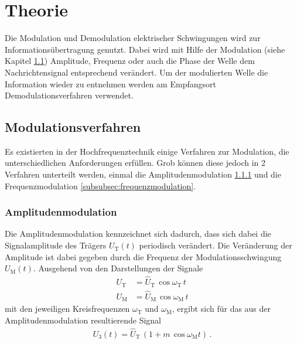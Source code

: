 \section{Theorie}
\label{sec:Theorie}
Die Modulation und Demodulation
elektrischer Schwingungen wird
zur Informationsübertragung genutzt.
Dabei wird mit Hilfe der Modulation
(siehe Kapitel \ref{subsec:modulationsverfahren})
Amplitude, Frequenz oder auch die Phase
der Welle dem Nachrichtensignal entsprechend
verändert.
Um der modulierten Welle die Information
wieder zu entnehmen werden am Empfangsort
Demodulationsverfahren verwendet.

\subsection{Modulationsverfahren}
\label{subsec:modulationsverfahren}
Es existierten in der Hochfrequenztechnik einige
Verfahren zur Modulation, die unterschiedlichen
Anforderungen erfüllen. Grob können diese
jedoch in 2 Verfahren unterteilt
werden, einmal die Amplitudenmodulation \ref{subsubsec:amplitudenmodulation}
und die Frequenzmodulation \ref{subsubsec:frequenzmodulation}.

\subsubsection{Amplitudenmodulation}
\label{subsubsec:amplitudenmodulation}
Die Amplitudenmodulation kennzeichnet sich
dadurch, dass sich dabei die Signalamplitude
des Trägers $U_{\text{T}}(t)$ periodisch verändert.
Die Veränderung der Amplitude ist dabei gegeben
durch die Frequenz der Modulationsschwingung
$U_{\text{M}}(t)$.
Ausgehend von den Darstellungen der Signale
\begin{align}
U_{\text{T}} &= \hat{U}_{\text{T}} \, \cos \omega_{\text{T}} \, t \\
U_{\text{M}} &= \hat{U}_{\text{M}} \, \cos \omega_{\text{M}} \, t
\end{align}
mit den jeweiligen Kreisfrequenzen $\omega_{\text{T}}$ und $\omega_{\text{M}}$,
ergibt sich für das aus der Amplitudenmodulation resultierende Signal
\begin{align}
\label{eqn:1}
U_{3}(t) = \hat{U}_{\text{T}} \, \left( 1 + m \, \cos \omega_{\text{M}} t \right) \, .
\end{align}

